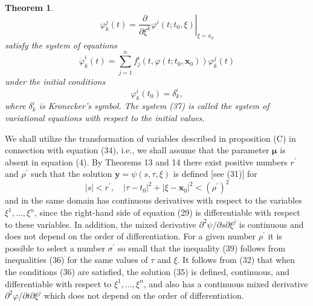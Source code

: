 \documentclass[10pt,a5paper]{book}
\makeatletter
\theoremstyle{plain}
\newtheorem{theorem}{Theorem}
\theoremstyle{definition}
\theoremstyle{remark}
\renewenvironment{proof}[1][\proofname]{\par
  \pushQED{\qed}%
  \normalfont\topsep6\p@\@plus6\p@\relax
  \trivlist
  \item\relax{\itshape #1\@addpunct{.}}\hspace\labelsep\ignorespaces
}{\popQED\endtrivlist\@endpefalse}
\makeatother
\begin{document}
\begin{theorem}
\[
\varphi_{k}^{j}(t)=\left.\frac{\partial}{\partial \xi^{k}} \varphi^{i}\left(t ; t_{0}, \xi\right)\right|_{\xi=x_{0}}
\]
satisfy the system of equations
\begin{equation*}
\dot{\varphi}_{k}^{i}(t)=\sum_{j=1}^{n} f_{j}^{i}\left(t, \varphi\left(t ; t_{0}, \mathbf{x}_{0}\right)\right) \varphi_{k}^{j}(t) \tag{37}
\end{equation*}
under the initial conditions
\begin{equation*}
\varphi_{k}^{i}\left(t_{0}\right)=\delta_{k}^{i}, \tag{38}
\end{equation*}
where $\delta_{k}^{i}$ is Kronecker's symbol. The system (37) is called the system of variational equations with respect to the initial values.
\end{theorem}

\begin{proof}
We shall utilize the transformation of variables described in proposition (C) in connection with equation (34), i.e., we shall assume that the parameter $\boldsymbol{\mu}$ is absent in equation (4). By Theorems 13 and 14 there exist positive numbers $r^{\prime}$ and $\rho^{\prime}$ such that the solution $\mathbf{y}=\psi(s, \tau, \xi)$ is defined [see (31)] for
\begin{equation*}
|s|<r^{\prime}, \quad\left|\tau-t_{0}\right|^{2}+\left|\xi-\mathbf{x}_{0}\right|^{2}<\left(\rho^{\prime}\right)^{2} \tag{39}
\end{equation*}
and in the same domain has continuous derivatives with respect to the variables $\xi^{1}, \ldots, \xi^{n}$, since the right-hand side of equation (29) is differentiable with respect to these variables. In addition, the mixed derivative $\partial^{2} \psi / \partial s \partial \xi^{j}$ is continuous and does not depend on the order of differentiation. For a given number $\rho^{\prime}$ it is possible to select a number $\sigma^{\prime}$ so small that the inequality (39) follows from inequalities (36) for the same values of $\tau$ and $\xi$. It follows from (32) that when the conditions (36) are satisfied, the solution (35) is defined, continuous, and differentiable with respect to $\xi^{1}, \ldots, \xi^{n}$, and also has a continuous mixed derivative $\partial^{2} \varphi / \partial t \partial \xi^{j}$ which does not depend on the order of differentiation.


\end{proof}
\end{document}
